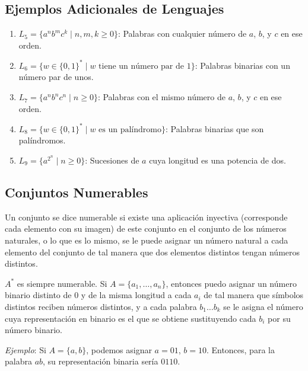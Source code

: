 \documentclass[12pt]{book} %
\providecommand{\tightlist}{%
  \setlength{\itemsep}{0pt}\setlength{\parskip}{0pt}}
\begin{document}
\hypertarget{ejemplos-adicionales-de-lenguajes}{%
\subsection{Ejemplos Adicionales de
Lenguajes}\label{ejemplos-adicionales-de-lenguajes}}

\begin{enumerate}
\def\labelenumi{\arabic{enumi}.}
\tightlist
\item
  \(L_5 = \{a^n b^m c^k \mid n, m, k \geq 0\}\): Palabras con cualquier
  número de \(a\), \(b\), y \(c\) en ese orden.\\
\item
  \(L_6 = \{w \in \{0, 1\}^* \mid w \text{ tiene un número par de } 1\}\):
  Palabras binarias con un número par de unos.\\
\item
  \(L_7 = \{a^n b^n c^n \mid n \geq 0\}\): Palabras con el mismo número
  de \(a\), \(b\), y \(c\) en ese orden.\\
\item
  \(L_8 = \{w \in \{0, 1\}^* \mid w \text{ es un palíndromo}\}\):
  Palabras binarias que son palíndromos.\\
\item
  \(L_9 = \{a^{2^n} \mid n \geq 0\}\): Sucesiones de \(a\) cuya longitud
  es una potencia de dos.
\end{enumerate}

\hypertarget{conjuntos-numerables}{%
\subsection{Conjuntos Numerables}\label{conjuntos-numerables}}

Un conjunto se dice numerable si existe una aplicación inyectiva
(corresponde cada elemento con su imagen) de este conjunto en el
conjunto de los números naturales, o lo que es lo mismo, se le puede
asignar un número natural a cada elemento del conjunto de tal manera que
dos elementos distintos tengan números distintos.

\begin{ejemplo}
$A^*$ es siempre numerable. Si $A = \{a_1, \ldots, a_n\}$, entonces puedo asignar un número binario distinto de 0 y de la misma longitud a cada $a_i$ de tal manera que símbolos distintos reciben números distintos, y a cada palabra $b_1 \ldots b_k$ se le asigna el número cuya representación en binario es el que se obtiene sustituyendo cada $b_i$ por su número binario.  

\textit{Ejemplo}: Si $A = \{a, b\}$, podemos asignar $a = 01$, $b = 10$. Entonces, para la palabra $ab$, su representación binaria sería $0110$.  
\end{ejemplo}
\end{document}

